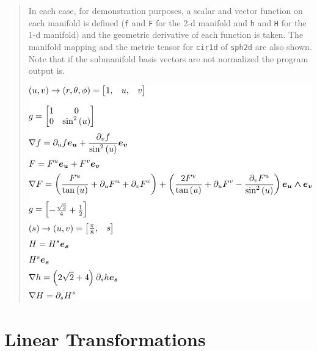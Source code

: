 \documentclass[12pt]{report}
\newcommand{\T}[1]{\texttt{#1}}
\begin{document}
\begin{quote}
	In each case, for demonstration purposes, a scalar and vector function on each manifold is defined (\T{f} and \T{F}
	for the 2-d manifold and \T{h} and \T{H} for the 1-d manifold) and the geometric derivative of each function is taken.  The 
	manifold mapping and the metric tensor for \T{cir1d} of \T{sph2d} are also shown. Note that if the submanifold basis vectors
	are not normalized the program output is.
	\begin{center}
	\includegraphics[scale=1]{python/submanifold1.pdf}	
	\end{center} 		
\end{quote}

\section{Linear Transformations}
\end{document}
